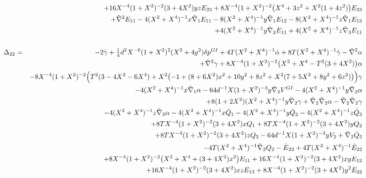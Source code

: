 \documentclass[10pt,letterpaper]{article}
\numberwithin{equation}{section}
\begin{document}
\begin{eqnarray}
&& + 16 X^{-4} (1 + X^2)^{-2} (3 + 4 X^2) y z E_{23} + 8 X^{-4} (1 + X^2)^{-2} \bigl(X^4 + 3 z^2 + X^2 (1 + 4 z^2)\bigr) E_{33} \nonumber \\ 
&& + \tilde{\nabla}^{2}E_{11} - 4 (X^2 + X^4)^{-1} x \tilde{\nabla}_{1}E_{11} - 8 (X^2 + X^4)^{-1} y \tilde{\nabla}_{1}E_{12} - 8 (X^2 + X^4)^{-1} z \tilde{\nabla}_{1}E_{13} \nonumber \\ 
&& + 4 (X^2 + X^4)^{-1} y \tilde{\nabla}_{2}E_{11} + 4 (X^2 + X^4)^{-1} z \tilde{\nabla}_{3}E_{11}
\\  \nonumber\\ 
\Delta_{22}&=& -2 \overset{..}{\gamma} + \tfrac{1}{4} d^2 X^{-6} (1 + X^2)^2 (X^2 + 4 y^2) \delta p^{GI}{} + 4 T (X^2 + X^4)^{-1} \dot{\alpha} + 8 T (X^2 + X^4)^{-1} \dot{\gamma} -  \tilde{\nabla}^{2}\alpha \nonumber \\ 
&& + \tilde{\nabla}^{2}\gamma + 8 X^{-4} (1 + X^2)^{-2} \bigl(X^2 + X^4 -  T^2 (3 + 4 X^2)\bigr) \alpha \nonumber \\ 
&& - 8 X^{-4} (1 + X^2)^{-2} \Bigl(T^2 (3 - 4 X^2 - 6 X^4) + X^2 \bigl(-1 + (8 + 6 X^2) x^2 + 10 y^2 + 8 z^2 + X^2 (7 + 5 X^2 + 8 y^2 + 6 z^2)\bigr)\Bigr) \gamma \nonumber \\ 
&& - 4 (X^2 + X^4)^{-1} x \tilde{\nabla}_{1}\alpha - 64 d^{-1} X (1 + X^2)^{-3} y \tilde{\nabla}_{2}V^{GI}{} - 4 (X^2 + X^4)^{-1} y \tilde{\nabla}_{2}\alpha \nonumber \\ 
&& + 8 (1 + 2 X^2) (X^2 + X^4)^{-1} y \tilde{\nabla}_{2}\gamma + \tilde{\nabla}_{2}\tilde{\nabla}_{2}\alpha -  \tilde{\nabla}_{2}\tilde{\nabla}_{2}\gamma \nonumber \\ 
&& - 4 (X^2 + X^4)^{-1} z \tilde{\nabla}_{3}\alpha -4 (X^2 + X^4)^{-1} x \dot{Q}_{1} - 4 (X^2 + X^4)^{-1} y \dot{Q}_{2} - 4 (X^2 + X^4)^{-1} z \dot{Q}_{3} \nonumber \\ 
&& + 8 T X^{-4} (1 + X^2)^{-2} (3 + 4 X^2) x Q_{1} + 8 T X^{-4} (1 + X^2)^{-2} (3 + 4 X^2) y Q_{2} \nonumber \\ 
&& + 8 T X^{-4} (1 + X^2)^{-2} (3 + 4 X^2) z Q_{3} - 64 d^{-1} X (1 + X^2)^{-3} y V_{2} + \tilde{\nabla}_{2}\dot{Q}_{2} \nonumber \\ 
&& - 4 T (X^2 + X^4)^{-1} \tilde{\nabla}_{2}Q_{2}- \overset{..}{E}_{22} + 4 T (X^2 + X^4)^{-1} \dot{E}_{22} \nonumber \\ 
&& + 8 X^{-4} (1 + X^2)^{-2} \bigl(X^2 + X^4 + (3 + 4 X^2) x^2\bigr) E_{11} + 16 X^{-4} (1 + X^2)^{-2} (3 + 4 X^2) x y E_{12} \nonumber \\ 
&& + 16 X^{-4} (1 + X^2)^{-2} (3 + 4 X^2) x z E_{13} + 8 X^{-4} (1 + X^2)^{-2} (3 + 4 X^2) y^2 E_{22} \nonumber \\ 

\end{eqnarray}
\end{document}
